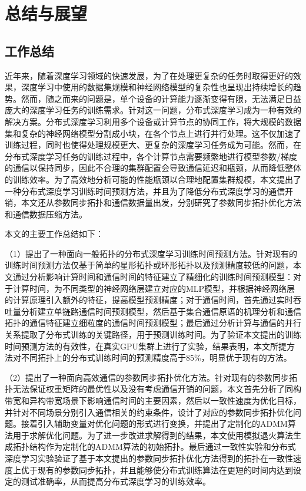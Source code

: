\chapter{总结与展望}
\section{工作总结}
近年来，随着深度学习领域的快速发展，为了在处理更复杂的任务时取得更好的效果，深度学习中使用的数据集规模和神经网络模型的复杂性也呈现出持续增长的趋势。然而，随之而来的问题是，单个设备的计算能力逐渐变得有限，无法满足日益庞大的深度学习任务的训练需求。针对这一问题，分布式深度学习成为一种有效的解决方案。分布式深度学习利用多个设备或计算节点的协同工作，将大规模的数据集和复杂的神经网络模型分割成小块，在各个节点上进行并行处理。这不仅加速了训练过程，同时也使得处理规模更大、更复杂的深度学习任务成为可能。然而，在分布式深度学习任务的训练过程中，各个计算节点需要频繁地进行模型参数/梯度的通信以保持同步，因此不合理的集群配置会导致通信延迟和瓶颈，从而降低整体的训练效率。为了高效地分析可能的性能瓶颈以合理地配置集群规模，本文提出了一种分布式深度学习训练时间预测方法，并且为了降低分布式深度学习的通信开销，本文还从参数同步拓扑和通信数据量出发，分别研究了参数同步拓扑优化方法和通信数据压缩方法。

本文的主要工作总结如下：

（1）提出了一种面向一般拓扑的分布式深度学习训练时间预测方法。针对现有的训练时间预测方法仅基于简单的星形拓扑或环形拓扑以及预测精度较低的问题，本文通过分析影响计算时间和通信时间的特征建立了精细化的训练时间预测模型：对于计算时间，为不同类型的神经网络层建立对应的MLP模型，并根据神经网络层的计算原理引入额外的特征，提高模型预测精度；对于通信时间，首先通过实时吞吐量分析建立单链路通信时间预测模型，然后基于集合通信原语的机理分析和通信拓扑的通信特征建立细粒度的通信时间预测模型；最后通过分析计算与通信的并行关系提取了分布式训练的关键路径，用于预测训练时间。为了验证本文提出的训练时间预测方法的有效性，在真实GPU集群上进行了实验，结果表明，本文所提方法对不同拓扑上的分布式训练时间的预测精度高于85\%，明显优于现有的方法。

（2）提出了一种面向高效通信的参数同步拓扑优化方法。针对现有的参数同步拓扑无法保证权重矩阵的最优性以及没有考虑通信开销的问题，本文首先分析了同构带宽和异构带宽场景下影响通信时间的主要因素，然后以一致性速度为优化目标，并针对不同场景分别引入通信相关的约束条件，设计了对应的参数同步拓扑优化问题。接着引入辅助变量对优化问题的形式进行变换，并提出了定制化的ADMM算法用于求解优化问题。为了进一步改进求解得到的结果，本文使用模拟退火算法生成拓扑结构作为定制化的ADMM算法的初始拓扑。最后通过一致性实验和分布式深度学习实验验证了基于本文提出的参数同步拓扑优化方法得到的拓扑在一致性速度上优于现有的参数同步拓扑，并且能够使分布式训练算法在更短的时间内达到设定的测试准确率，从而提高分布式深度学习的训练效率。

